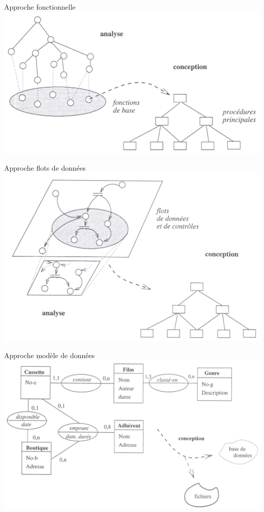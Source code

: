 \documentclass[14pt]{beamer}
\begin{document}
\begin{framentitle}{Approche fonctionnelle}
    \includegraphics[width=\textwidth]{fig1b.png}
\end{framentitle}

\begin{framentitle}{Approche flots de données}
    \includegraphics[width=\textwidth]{fig3a.png}
\end{framentitle}

\begin{framentitle}{Approche modèle de données}
    \includegraphics[width=\textwidth]{fig3b.png}
\end{framentitle}
\end{document}
